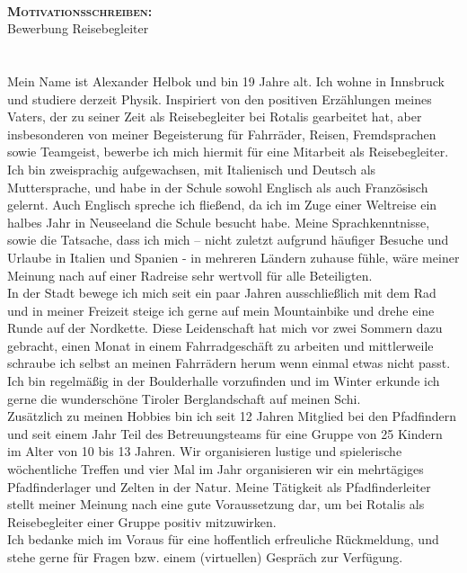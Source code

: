 \documentclass{alex_cv}
\begin{document}
\headerview
\vspace{2ex}\\
%
\begin{minipage}{\linewidth}
	{\scshape\bfseries\color{alex} Motivationsschreiben:}\\
	\small Bewerbung Reisebegleiter
\end{minipage}
%
\section{}
Mein Name ist Alexander Helbok und bin 19 Jahre alt. Ich wohne in Innsbruck und studiere derzeit Physik. Inspiriert von den positiven Erzählungen meines Vaters, der zu seiner Zeit als Reisebegleiter bei Rotalis gearbeitet hat, aber insbesonderen von meiner Begeisterung für Fahrräder, Reisen, Fremdsprachen sowie Teamgeist, bewerbe ich mich hiermit für eine Mitarbeit als Reisebegleiter.\\

Ich bin zweisprachig aufgewachsen, mit Italienisch und Deutsch als Muttersprache, und habe in der Schule sowohl Englisch als auch Französisch gelernt. Auch Englisch spreche ich fließend, da ich im Zuge einer Weltreise ein halbes Jahr in Neuseeland die Schule besucht habe. Meine Sprachkenntnisse, sowie die Tatsache, dass ich mich – nicht zuletzt aufgrund häufiger Besuche und Urlaube in Italien und Spanien - in mehreren Ländern zuhause fühle, wäre meiner Meinung nach auf einer Radreise sehr wertvoll für alle Beteiligten.\\

In der Stadt bewege ich mich seit ein paar Jahren ausschließlich mit dem Rad und in meiner Freizeit steige ich gerne auf mein Mountainbike und drehe eine Runde auf der Nordkette. Diese Leidenschaft hat mich vor zwei Sommern dazu gebracht, einen Monat in einem Fahrradgeschäft zu arbeiten und mittlerweile schraube ich selbst an meinen Fahrrädern herum wenn einmal etwas nicht passt. Ich bin regelmäßig in der Boulderhalle vorzufinden und im Winter erkunde ich gerne die wunderschöne Tiroler Berglandschaft auf meinen Schi.\\

Zusätzlich zu meinen Hobbies bin ich seit 12 Jahren Mitglied bei den Pfadfindern und seit einem Jahr Teil des Betreuungsteams für eine Gruppe von 25 Kindern im Alter von 10 bis 13 Jahren. Wir organisieren lustige und spielerische wöchentliche Treffen und vier Mal im Jahr organisieren wir ein mehrtägiges Pfadfinderlager und Zelten in der Natur. Meine Tätigkeit als Pfadfinderleiter stellt meiner Meinung nach eine gute Voraussetzung dar, um bei Rotalis als Reisebegleiter einer Gruppe positiv mitzuwirken. \\

Ich bedanke mich im Voraus für eine hoffentlich erfreuliche Rückmeldung, und stehe gerne für Fragen bzw. einem (virtuellen) Gespräch zur Verfügung.

\createfootnote
\end{document}
